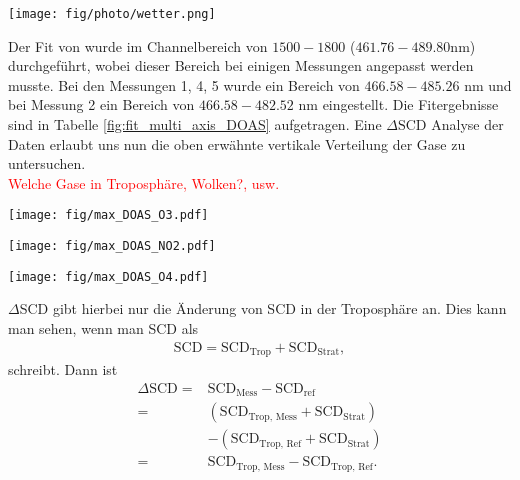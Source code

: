 \documentclass[12pt, a4paper, bibliography=totoc]{scrartcl}
\begin{document}
\begin{multicols}{2}
\begin{center}
	\texttt{[image: fig/photo/wetter.png]}
	\label{fig:weather}
\end{center} 

Der Fit von  wurde im Channelbereich von $1500-1800$ ($461.76 - 489.80$\si{nm}) durchgeführt, wobei dieser Bereich bei einigen Messungen angepasst werden musste. 
Bei den Messungen 1, 4, 5 wurde ein Bereich von $466.58 - 485.26$ \si{nm} und bei Messung 2 ein Bereich von $466.58 - 482.52$ \si{nm} eingestellt.
Die Fitergebnisse sind in Tabelle \ref{fig:fit_multi_axis_DOAS} aufgetragen.
Eine $\Delta \text{SCD}$ Analyse der Daten erlaubt uns nun die oben erwähnte vertikale Verteilung der Gase zu untersuchen.
\\
\textcolor{red}{Welche Gase in Troposphäre, Wolken?, usw.}
\\
\begin{center}
	\texttt{[image: fig/max\_DOAS\_O3.pdf]}
	\label{fig:max_doas_o3}
\end{center}

\begin{center}
	\texttt{[image: fig/max\_DOAS\_NO2.pdf]}
	\label{fig:max_doas_no2}
\end{center}

\begin{center}
	\texttt{[image: fig/max\_DOAS\_O4.pdf]}
	\label{fig:max_doas_o4}
\end{center}

$\Delta$SCD gibt hierbei nur die Änderung von SCD in der Troposphäre an.
Dies kann man sehen, wenn man SCD als
\begin{align}
    \text{SCD} = \text{SCD}_\text{Trop} + \text{SCD}_\text{Strat},
\end{align}
schreibt.
Dann ist 
\begin{align}
\Delta\text{SCD} =& \text{SCD}_{\text{Mess}} - \text{SCD}_\text{ref} \\
    =& (\text{SCD}_{\text{Trop, \ Mess}} + \text{SCD}_{\text{Strat}}) \\
    & - (\text{SCD}_{\text{Trop, \ Ref}} + \text{SCD}_{\text{Strat}}) \\
    =& \text{SCD}_{\text{Trop, \ Mess}} - \text{SCD}_{\text{Trop, \ Ref}}. \label{eq:SCD_trop}
\end{align}


\end{multicols}
\end{document}
